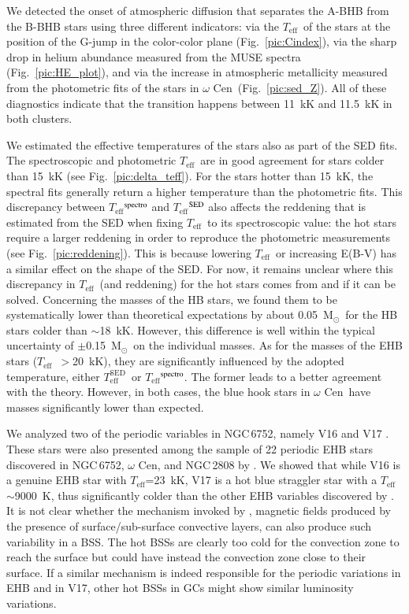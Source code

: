 \documentclass{aa}
\newcommand{\msun}{$\text{M}_\odot$}
\newcommand{\teff}{$T_{\text{eff}}$}
\newcommand{\teffsed}{$T_{\text{eff}}^{\text{SED}}$}
\newcommand{\Cen}{$\omega$ Cen}
\newcommand{\ngc}{NGC\,6752}
\begin{document}
We detected the onset of atmospheric diffusion that separates the A-BHB from the B-BHB stars 
using three different indicators: via the \teff\ of the stars at the position of the G-jump in the color-color plane (Fig.~\ref{pic:Cindex}), via the sharp drop in helium abundance measured from the MUSE spectra (Fig.~\ref{pic:HE_plot}), and via the increase in atmospheric metallicity measured from the photometric fits of the stars in \Cen\ (Fig.~\ref{pic:sed_Z}). All of these diagnostics indicate that the transition happens between 11~kK and 11.5~kK in both clusters.

We estimated the effective temperatures of the stars also as part of the SED fits. The spectroscopic and photometric \teff\ are in good agreement for stars colder than 15~kK (see Fig.~\ref{pic:delta_teff}). For the stars hotter than 15~kK, the spectral fits generally return a higher temperature than the photometric fits. This discrepancy between \teff$^{\rm spectro}$ and \teff$^{\rm SED}$ also affects the reddening that is estimated from the SED when fixing \teff\ to its spectroscopic value: the hot stars require a larger reddening in order to reproduce the photometric measurements (see Fig.~\ref{pic:reddening}). This is because lowering \teff\ or increasing E(B-V) has a similar effect on the shape of the SED.
For now, it remains unclear where this discrepancy in \teff\ (and reddening) for the hot stars comes from and if it can be solved. 
Concerning the masses of the HB stars, we found them to be systematically lower than theoretical expectations by about 0.05~\msun\ for the HB stars colder than $\sim$18~kK. However, this difference is well within the typical uncertainty of $\pm$0.15~\msun\ on the individual masses. As for the masses of the EHB stars (\teff\ $>$20~kK), they are significantly influenced by the adopted temperature, either \teffsed\ or \teff$^{\rm spectro}$. The former leads to a better agreement with the theory. However, in both cases, the blue hook stars in \Cen\ have masses significantly lower than expected.

We analyzed two of the periodic variables in \ngc, namely V16 and V17 \citep{kaluzny2009}. These stars were also presented among the sample of 22 periodic EHB stars discovered in \ngc, \Cen, and NGC\,2808 by \citet{momany2020}. 
We showed that while V16 is a genuine EHB star with \teff=23~kK, V17 is a hot blue straggler star with a \teff\ $\sim$9000~K, thus significantly colder than the other EHB variables discovered by \citet{momany2020}. It is not clear whether the mechanism invoked by \citet{momany2020}, magnetic fields produced by the presence of surface/sub-surface convective layers, can also produce such variability in a BSS. The hot BSSs are clearly too cold for the  convection zone to reach the surface but could have instead the  convection zone close to their surface. If a similar mechanism is indeed responsible for the periodic variations in EHB and in V17, other hot BSSs in GCs might show similar luminosity variations.
\end{document}

